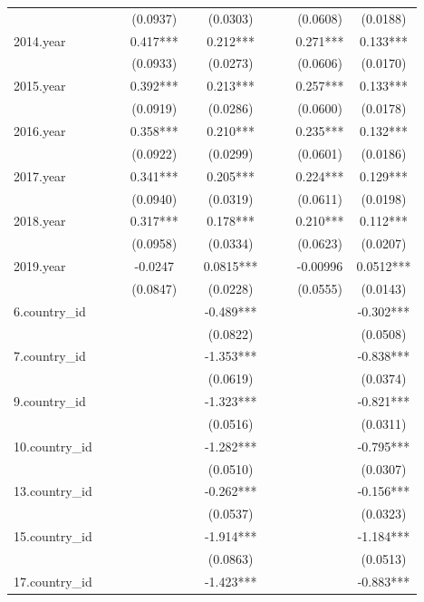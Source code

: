 \documentclass[]{article}
\begin{document}
\begin{tabular}{lccccccccc}
 &  &  & (0.0937) &  & (0.0303) &  &  & (0.0608) & (0.0188) \\
2014.year &  &  & 0.417*** &  & 0.212*** &  &  & 0.271*** & 0.133*** \\
 &  &  & (0.0933) &  & (0.0273) &  &  & (0.0606) & (0.0170) \\
2015.year &  &  & 0.392*** &  & 0.213*** &  &  & 0.257*** & 0.133*** \\
 &  &  & (0.0919) &  & (0.0286) &  &  & (0.0600) & (0.0178) \\
2016.year &  &  & 0.358*** &  & 0.210*** &  &  & 0.235*** & 0.132*** \\
 &  &  & (0.0922) &  & (0.0299) &  &  & (0.0601) & (0.0186) \\
2017.year &  &  & 0.341*** &  & 0.205*** &  &  & 0.224*** & 0.129*** \\
 &  &  & (0.0940) &  & (0.0319) &  &  & (0.0611) & (0.0198) \\
2018.year &  &  & 0.317*** &  & 0.178*** &  &  & 0.210*** & 0.112*** \\
 &  &  & (0.0958) &  & (0.0334) &  &  & (0.0623) & (0.0207) \\
2019.year &  &  & -0.0247 &  & 0.0815*** &  &  & -0.00996 & 0.0512*** \\
 &  &  & (0.0847) &  & (0.0228) &  &  & (0.0555) & (0.0143) \\
6.country\_id &  &  &  &  & -0.489*** &  &  &  & -0.302*** \\
 &  &  &  &  & (0.0822) &  &  &  & (0.0508) \\
7.country\_id &  &  &  &  & -1.353*** &  &  &  & -0.838*** \\
 &  &  &  &  & (0.0619) &  &  &  & (0.0374) \\
9.country\_id &  &  &  &  & -1.323*** &  &  &  & -0.821*** \\
 &  &  &  &  & (0.0516) &  &  &  & (0.0311) \\
10.country\_id &  &  &  &  & -1.282*** &  &  &  & -0.795*** \\
 &  &  &  &  & (0.0510) &  &  &  & (0.0307) \\
13.country\_id &  &  &  &  & -0.262*** &  &  &  & -0.156*** \\
 &  &  &  &  & (0.0537) &  &  &  & (0.0323) \\
15.country\_id &  &  &  &  & -1.914*** &  &  &  & -1.184*** \\
 &  &  &  &  & (0.0863) &  &  &  & (0.0513) \\
17.country\_id &  &  &  &  & -1.423*** &  &  &  & -0.883*** \\

\end{tabular}
\end{document}
